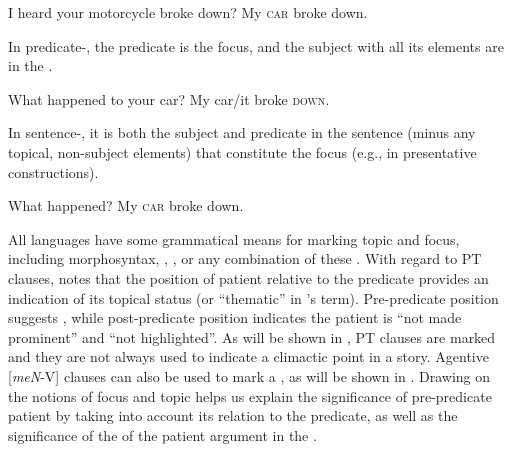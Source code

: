 \documentclass[output=paper
,modfonts
,nonflat]{langsci/langscibook}
\begin{document}
\begin{exe}
	\ex\label{e:djenar:11}
	\begin{xlist}
		 I heard your motorcycle broke down?
		 My \textsc{car} broke down.\\
		\hfill \citep[48, 223]{Lambrecht1994}
	\end{xlist}
\end{exe}

\noindent
In predicate-, the predicate is the focus, and the subject with all its elements are in the .  

\begin{exe}
	\ex\label{e:djenar:12}
	\begin{xlist}
		 What happened to your car?
		 My car/it broke \textsc{down}.\\
		\hfill \citep[48, 223]{Lambrecht1994}
	\end{xlist}
\end{exe}

\noindent
In sentence-, it is both the subject and predicate in the sentence (minus any topical, non-subject elements) that constitute the focus (e.g., in presentative constructions).

\begin{exe}
	\ex\label{e:djenar:13}
	\begin{xlist}
		 What happened?
		 My \textsc{car} broke down.\\
		\hfill \citep[48, 223]{Lambrecht1994}
	\end{xlist}
\end{exe}

\noindent
All languages have some grammatical means for marking topic and focus, including morphosyntax, , , or any combination of these \citep[201]{VanValin1997}. With regard to  PT clauses, \citet[175]{Cumming1991} notes that the position of patient relative to the predicate provides an indication of its topical status (or “thematic” in \citeauthor{Kaswanti1988}'s \citeyear[226]{Kaswanti1988} term). Pre-predicate position suggests , while post-predicate position indicates the patient is “not made prominent” and “not highlighted”. As will be shown in , PT clauses are marked and they are not always used to indicate a climactic point in a story. Agentive [\textit{meN}-V] clauses can also be used to mark a , as will be shown in . Drawing on the notions of focus and topic helps us explain the significance of pre-predicate patient by taking into account its relation to the predicate, as well as the significance of the  of the patient argument in the . 
\end{document}
